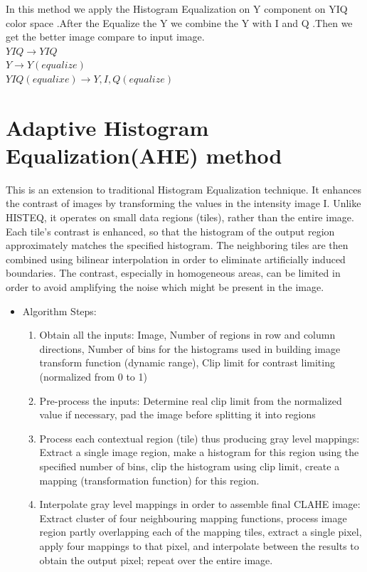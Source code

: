 \begin{itemize}
			In this method we apply the Histogram Equalization on Y component on YIQ
			color space .After the Equalize the Y we combine the Y with I and Q .Then we get the better image compare to 				input image.\\
			$YIQ \rightarrow YIQ$\\
			$Y \rightarrow Y(equalize)$\\
			$YIQ(equalixe) \rightarrow Y, I, Q(equalize)$\\
\end{itemize}

\section{Adaptive Histogram Equalization(AHE) method}
This is an extension to traditional Histogram Equalization
technique. It enhances the contrast of images by transforming
the values in the intensity image I. Unlike HISTEQ, it operates
on small data regions (tiles), rather than the entire image. Each
tile's contrast is enhanced, so that the histogram of the output
region approximately matches the specified histogram. The
neighboring tiles are then combined using bilinear interpolation
in order to eliminate artificially induced boundaries.
The contrast, especially in homogeneous areas, can be limited
in order to avoid amplifying the noise which might be present
in the image.
\begin{itemize}
	\item Algorithm Steps:
	\begin{enumerate}
		\item Obtain all the inputs: Image, Number of regions in row and column directions, Number of bins for the 	
		histograms used in building image transform function (dynamic range), Clip limit for contrast limiting (normalized 	
		from 0 to 1)
		\item Pre-process the inputs: Determine real clip limit from the normalized value if necessary, pad the image 
		before splitting it into regions
		\item Process each contextual region (tile) thus producing gray level mappings: Extract a single image region, make 
		a histogram for this region using the specified number of bins, clip the histogram using clip limit, create a 
		mapping (transformation function) for this region.
		\item Interpolate gray level mappings in order to assemble final CLAHE image: Extract cluster of four neighbouring 
		mapping functions, process image region partly overlapping each of the mapping tiles, extract a single pixel, apply
		four mappings to that pixel, and interpolate between the results to obtain the output pixel; repeat over the entire 
		image.
	\end{enumerate}
\end{itemize}

